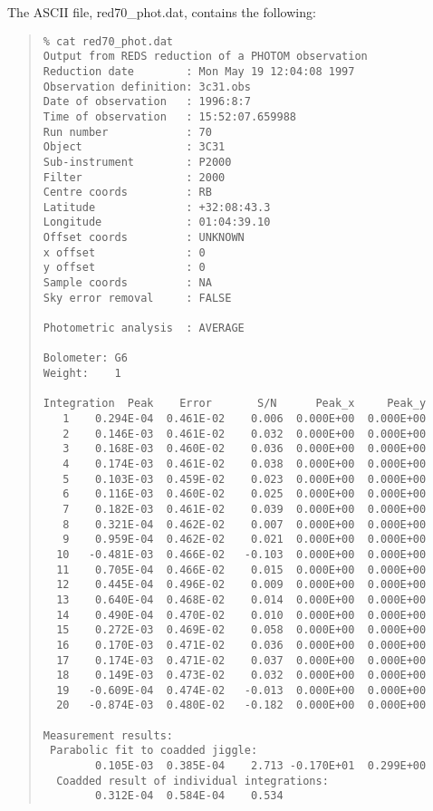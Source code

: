 \documentclass[twoside,11pt,fleqn]{article}
\newenvironment{myquote}{\begin{quote}\begin{small}}{\end{small}\end{quote}}
\begin{document}
The ASCII file, red70\_phot.dat, contains the following:

\begin{myquote}
\begin{verbatim}
% cat red70_phot.dat
Output from REDS reduction of a PHOTOM observation
Reduction date        : Mon May 19 12:04:08 1997
Observation definition: 3c31.obs
Date of observation   : 1996:8:7
Time of observation   : 15:52:07.659988
Run number            : 70
Object                : 3C31
Sub-instrument        : P2000
Filter                : 2000
Centre coords         : RB
Latitude              : +32:08:43.3
Longitude             : 01:04:39.10
Offset coords         : UNKNOWN
x offset              : 0
y offset              : 0
Sample coords         : NA
Sky error removal     : FALSE

Photometric analysis  : AVERAGE

Bolometer: G6
Weight:    1

Integration  Peak    Error       S/N      Peak_x     Peak_y
   1    0.294E-04  0.461E-02    0.006  0.000E+00  0.000E+00
   2    0.146E-03  0.461E-02    0.032  0.000E+00  0.000E+00
   3    0.168E-03  0.460E-02    0.036  0.000E+00  0.000E+00
   4    0.174E-03  0.461E-02    0.038  0.000E+00  0.000E+00
   5    0.103E-03  0.459E-02    0.023  0.000E+00  0.000E+00
   6    0.116E-03  0.460E-02    0.025  0.000E+00  0.000E+00
   7    0.182E-03  0.461E-02    0.039  0.000E+00  0.000E+00
   8    0.321E-04  0.462E-02    0.007  0.000E+00  0.000E+00
   9    0.959E-04  0.462E-02    0.021  0.000E+00  0.000E+00
  10   -0.481E-03  0.466E-02   -0.103  0.000E+00  0.000E+00
  11    0.705E-04  0.466E-02    0.015  0.000E+00  0.000E+00
  12    0.445E-04  0.496E-02    0.009  0.000E+00  0.000E+00
  13    0.640E-04  0.468E-02    0.014  0.000E+00  0.000E+00
  14    0.490E-04  0.470E-02    0.010  0.000E+00  0.000E+00
  15    0.272E-03  0.469E-02    0.058  0.000E+00  0.000E+00
  16    0.170E-03  0.471E-02    0.036  0.000E+00  0.000E+00
  17    0.174E-03  0.471E-02    0.037  0.000E+00  0.000E+00
  18    0.149E-03  0.473E-02    0.032  0.000E+00  0.000E+00
  19   -0.609E-04  0.474E-02   -0.013  0.000E+00  0.000E+00
  20   -0.874E-03  0.480E-02   -0.182  0.000E+00  0.000E+00

Measurement results:
 Parabolic fit to coadded jiggle:
        0.105E-03  0.385E-04    2.713 -0.170E+01  0.299E+00
  Coadded result of individual integrations:
        0.312E-04  0.584E-04    0.534
\end{verbatim}
\end{myquote}
\end{document}
